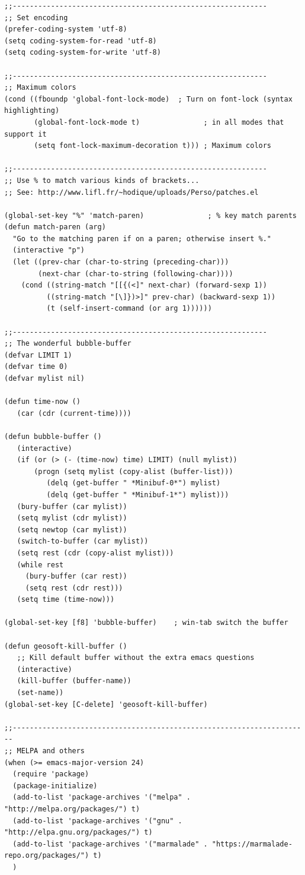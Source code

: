 \documentclass[12pt,spanish,]{article}
\begin{document}
\begin{verbatim}
;;------------------------------------------------------------
;; Set encoding
(prefer-coding-system 'utf-8)
(setq coding-system-for-read 'utf-8)
(setq coding-system-for-write 'utf-8)

;;------------------------------------------------------------
;; Maximum colors
(cond ((fboundp 'global-font-lock-mode)  ; Turn on font-lock (syntax highlighting)
       (global-font-lock-mode t)               ; in all modes that support it
       (setq font-lock-maximum-decoration t))) ; Maximum colors

;;------------------------------------------------------------
;; Use % to match various kinds of brackets...
;; See: http://www.lifl.fr/~hodique/uploads/Perso/patches.el

(global-set-key "%" 'match-paren)               ; % key match parents
(defun match-paren (arg)
  "Go to the matching paren if on a paren; otherwise insert %."
  (interactive "p")
  (let ((prev-char (char-to-string (preceding-char)))
        (next-char (char-to-string (following-char))))
    (cond ((string-match "[[{(<]" next-char) (forward-sexp 1))
          ((string-match "[\]})>]" prev-char) (backward-sexp 1))
          (t (self-insert-command (or arg 1))))))

;;------------------------------------------------------------
;; The wonderful bubble-buffer
(defvar LIMIT 1)
(defvar time 0)
(defvar mylist nil)

(defun time-now ()
   (car (cdr (current-time))))

(defun bubble-buffer ()
   (interactive)
   (if (or (> (- (time-now) time) LIMIT) (null mylist))
       (progn (setq mylist (copy-alist (buffer-list)))
          (delq (get-buffer " *Minibuf-0*") mylist)
          (delq (get-buffer " *Minibuf-1*") mylist)))
   (bury-buffer (car mylist))
   (setq mylist (cdr mylist))
   (setq newtop (car mylist))
   (switch-to-buffer (car mylist))
   (setq rest (cdr (copy-alist mylist)))
   (while rest
     (bury-buffer (car rest))
     (setq rest (cdr rest)))
   (setq time (time-now)))

(global-set-key [f8] 'bubble-buffer)    ; win-tab switch the buffer

(defun geosoft-kill-buffer ()
   ;; Kill default buffer without the extra emacs questions
   (interactive)
   (kill-buffer (buffer-name))
   (set-name))
(global-set-key [C-delete] 'geosoft-kill-buffer)

;;----------------------------------------------------------------------
;; MELPA and others
(when (>= emacs-major-version 24)
  (require 'package)
  (package-initialize)
  (add-to-list 'package-archives '("melpa" . "http://melpa.org/packages/") t)
  (add-to-list 'package-archives '("gnu" . "http://elpa.gnu.org/packages/") t)
  (add-to-list 'package-archives '("marmalade" . "https://marmalade-repo.org/packages/") t)
  )


\end{verbatim}
\end{document}
